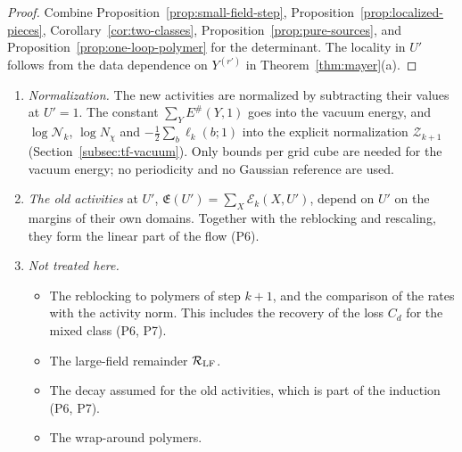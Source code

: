 \begin{proof}
Combine Proposition~\ref{prop:small-field-step}, Proposition~\ref{prop:localized-pieces}, Corollary~\ref{cor:two-classes}, Proposition~\ref{prop:pure-sources}, and Proposition~\ref{prop:one-loop-polymer} for the determinant. The locality in $U'$ follows from the data dependence on $Y^{(r')}$ in Theorem~\ref{thm:mayer}(a).
\end{proof}

\begin{remark}\label{rem:sf-step-remains}
\begin{enumerate}[label=(\alph*)]
\item \emph{Normalization.} The new activities are normalized by subtracting their values at $U'=1$. The constant $\sum_YE^\#(Y,1)$ goes into the vacuum energy, and $\log\mathcal N_k$, $\log N_\chi$ and $-\frac12\sum_b\ell_k(b;1)$ into the explicit normalization $\mathcal Z_{k+1}$ (Section~\ref{subsec:tf-vacuum}). Only bounds per grid cube are needed for the vacuum energy; no periodicity and no Gaussian reference are used.
\item \emph{The old activities} at $U'$, $\mathfrak E(U')=\sum_X\mathcal E_k(X,U')$, depend on $U'$ on the margins of their own domains. Together with the reblocking and rescaling, they form the linear part of the flow (P6).
\item \emph{Not treated here.}
  \begin{itemize}
  \item The reblocking to polymers of step $k+1$, and the comparison of the rates with the activity norm. This includes the recovery of the loss $C_d$ for the mixed class (P6, P7).
  \item The large-field remainder $\mathcal R_{\rm LF}$.
  \item The decay assumed for the old activities, which is part of the induction (P6, P7).
  \item The wrap-around polymers.
  \end{itemize}
\end{enumerate}
\end{remark}
